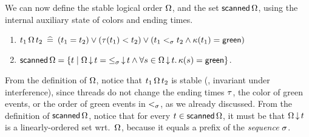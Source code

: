\begin{comment}
Proposition~\ref{inv:readFP} states that any non-$\bot$ value read
from the forwarding pointer $\mathit{fp}$ at line 12 might have been
written to $p$ after the scanner cleared the forwarding pointers, and
and hence, be newer than the values read in line 10. This captures the
essence of the first part of Jayanti's Second forwarding principle.
%
Proposition~\ref{inv:redzone} states that when the scanner is in
between lines~\lineScanReadsFX--\lineScanRelinks\ in
Figure~\ref{fig:jayanti-snapshot}, then $\hist$ can be partitioned
into a non-empty prefix with yellow and/or green timestamps, and a
reds-only suffix. Moreover, if a new write event $t$ occurs at this
point, with $ \toff < t <= \E (t)$, it will be colored red and hence
ignored by the current scanner. This later fact captures the last part
of the second Forwarding Principle. Later on, this proposition will be
crucial into proving that relink does not affect the order of write
events that are meant to missed, by keeping them in the red suffix,
and also that those being reordered are overlapping.

\gad{Explain better? The second part of this invariant might also be
  connected to Jayanti's ``Correctness'' Theorem, Lemma 5 in his
  Appendix. I'm not sure however if I need to express its connection
  here.}
\end{comment}

We can now define the stable logical order $\Omega$, and the set
$\mathsf{scanned}\,\Omega$, using the internal auxiliary state of colors
and ending times.
%
\begin{definition}\label{def-jleq}
\begin{enumerate}
\item $t_1\,{\Omega}\,t_2 \mathrel{\:\widehat{=}\:} (t_1 = t_2) \vee (\tau(t_1) <
  t_2) \vee (t_1 \mathrel{<_\sigma} t_2 \wedge \kappa(t_1) = \mathsf{green})$
\item  $\mathsf{scanned}\,\Omega = \{t \mid \Omega\,{\downarrow}\,t = {\mathrel{\leq_\sigma}}\,{\downarrow}\,t \wedge \forall s\in \Omega\,{\downarrow}\,t\mathord{.}\, \kappa(s) = \mathsf{green}\}$.
\end{enumerate}
\end{definition}

From the definition of $\Omega$, notice that
$t_1\,{\Omega}\,t_2$ is stable (\ie, invariant under
interference), since threads do not change the ending times $\tau$, the
color of green events, or the order of green events in $\mathrel{<_\sigma}$, as we
already discussed. 
%
From the definition of $\mathsf{scanned}\,\Omega$, notice that for every
$t \in \mathsf{scanned}\,\Omega$, it must be that
$\Omega\,{\downarrow}\,t$ is a linearly-ordered set
wrt.~$\Omega$, because it equals a prefix of the \emph{sequence}
$\sigma$.

